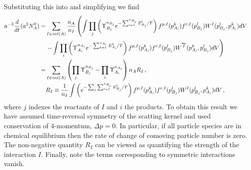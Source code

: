 {\color{black}
Substituting this into  and simplifying we find
\begin{align}\label{eq:comovingPartNumFRWfinal}
a^{-3}\frac{d}{dt}(a^3N_A^0)
=&\sum_{I\in int(A)}\frac{n_A}{n_I}\left(\int \prod_j\left(\Upsilon_{B_j}^{n_{B_j}}e^{-\sum_{l=1}^{n_{B_j}}E_{B_j}^l/T}\right)f^{p,I}(p_{A_i}^k)f^{r,I}(p_{B_j}^l)W^I(p_{B_j}^l,p_{A_i}^k)dV\right.\notag\\
&\left. -\int \prod_i\left(\Upsilon_{A_i}^{n_{A_i}}e^{-\sum_{k=1}^{n_{A_i}}E_{A_i}^k/T}\right)f^{p,I}(p_{A_i}^k)f^{r,I}(p_{B_j}^l)W^{\overleftarrow{I}}(p_{A_i}^k,p_{B_j}^l)dV\right)\notag\\
=&\sum_{I\in int(A)}\left(\prod_j\Upsilon_{B_j}^{n_{B_j}}- \prod_i\Upsilon_{A_i}^{n_{A_i}}\right){n_A}R_I\,,
\\
&R_I\equiv \frac{1}{n_I}\int\left(e^{-\sum_j\sum_{l=1}^{n_{B_j}}E_{B_j}^l/T}\right) f^{p,I}(p_{A_i}^k)f^{r,I}(p_{B_j}^l)W^I(p_{B_j}^l,p_{A_i}^k)dV\notag\,,
\end{align}
where $j$ indexes the reactants of $I$ and $i$ the products. To obtain this result we have assumed time-reversal symmetry of the scatting kernel  and used conservation of 4-momentum, $\Delta p=0$. In particular, if all particle species are in chemical equilibrium then the rate of change of comoving particle number is zero. The non-negative quantity $R_I$ can be viewed as quantifying the strength of the interaction $I$. Finally, note the terms corresponding to symmetric interactions vanish. 

}
